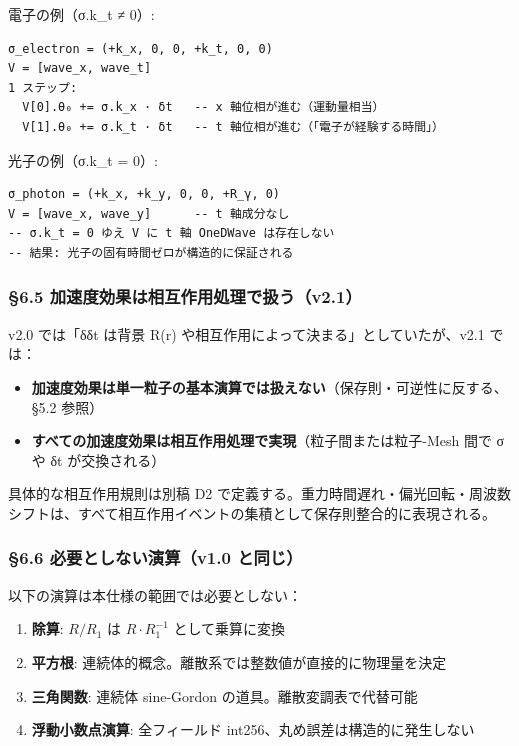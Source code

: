 \documentclass[a4paper,11pt]{ltjsarticle}
\providecommand{\tightlist}{\setlength{\itemsep}{0pt}\setlength{\parskip}{0pt}}
\begin{document}
電子の例（σ.k\_t ≠ 0）:

\begin{verbatim}
σ_electron = (+k_x, 0, 0, +k_t, 0, 0)
V = [wave_x, wave_t]
1 ステップ:
  V[0].θ₀ += σ.k_x · δt   -- x 軸位相が進む（運動量相当）
  V[1].θ₀ += σ.k_t · δt   -- t 軸位相が進む（「電子が経験する時間」）
\end{verbatim}

光子の例（σ.k\_t = 0）:

\begin{verbatim}
σ_photon = (+k_x, +k_y, 0, 0, +R_γ, 0)
V = [wave_x, wave_y]      -- t 軸成分なし
-- σ.k_t = 0 ゆえ V に t 軸 OneDWave は存在しない
-- 結果: 光子の固有時間ゼロが構造的に保証される
\end{verbatim}

\subsubsection{§6.5
加速度効果は相互作用処理で扱う（v2.1）}\label{ux52a0ux901fux5ea6ux52b9ux679cux306fux76f8ux4e92ux4f5cux7528ux51e6ux7406ux3067ux6271ux3046v2.1}

v2.0 では「δδt は背景 R(r) や相互作用によって決まる」としていたが、v2.1
では：

\begin{itemize}
\tightlist
\item
  \textbf{加速度効果は単一粒子の基本演算では扱えない}（保存則・可逆性に反する、§5.2
  参照）
\item
  \textbf{すべての加速度効果は相互作用処理で実現}（粒子間または粒子-Mesh
  間で σ や δt が交換される）
\end{itemize}

具体的な相互作用規則は別稿 D2
で定義する。重力時間遅れ・偏光回転・周波数シフトは、すべて相互作用イベントの集積として保存則整合的に表現される。

\subsubsection{§6.6 必要としない演算（v1.0
と同じ）}\label{ux5fc5ux8981ux3068ux3057ux306aux3044ux6f14ux7b97v1.0-ux3068ux540cux3058}

以下の演算は本仕様の範囲では必要としない：

\begin{enumerate}
\def\labelenumi{\arabic{enumi}.}
\tightlist
\item
  \textbf{除算}: \(R/R_1\) は \(R \cdot R_1^{-1}\) として乗算に変換
\item
  \textbf{平方根}: 連続体的概念。離散系では整数値が直接的に物理量を決定
\item
  \textbf{三角関数}: 連続体 sine-Gordon の道具。離散変調表で代替可能
\item
  \textbf{浮動小数点演算}: 全フィールド
  int256、丸め誤差は構造的に発生しない
\end{enumerate}
\end{document}
